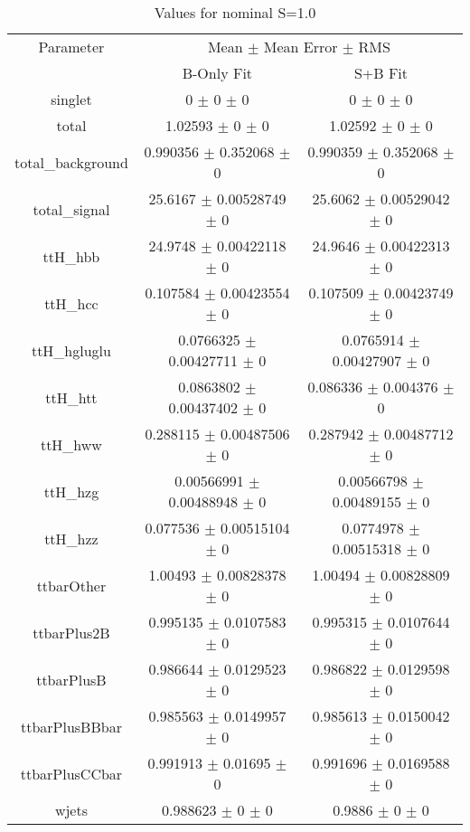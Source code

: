 \begin{table}
\centering
\caption{Values for nominal S=1.0}
\begin{tabular}{ccc}
\toprule
Parameter & \multicolumn{2}{c}{Mean $\pm$ Mean Error $\pm$ RMS}\\
 & B-Only Fit & S+B Fit\\
\midrule
singlet & \num{0} $\pm$ \num{0} $\pm$ \num{0} & \num{0} $\pm$ \num{0} $\pm$ \num{0}\\
total & \num{1.02593} $\pm$ \num{0} $\pm$ \num{0} & \num{1.02592} $\pm$ \num{0} $\pm$ \num{0}\\
total\_background & \num{0.990356} $\pm$ \num{0.352068} $\pm$ \num{0} & \num{0.990359} $\pm$ \num{0.352068} $\pm$ \num{0}\\
total\_signal & \num{25.6167} $\pm$ \num{0.00528749} $\pm$ \num{0} & \num{25.6062} $\pm$ \num{0.00529042} $\pm$ \num{0}\\
ttH\_hbb & \num{24.9748} $\pm$ \num{0.00422118} $\pm$ \num{0} & \num{24.9646} $\pm$ \num{0.00422313} $\pm$ \num{0}\\
ttH\_hcc & \num{0.107584} $\pm$ \num{0.00423554} $\pm$ \num{0} & \num{0.107509} $\pm$ \num{0.00423749} $\pm$ \num{0}\\
ttH\_hgluglu & \num{0.0766325} $\pm$ \num{0.00427711} $\pm$ \num{0} & \num{0.0765914} $\pm$ \num{0.00427907} $\pm$ \num{0}\\
ttH\_htt & \num{0.0863802} $\pm$ \num{0.00437402} $\pm$ \num{0} & \num{0.086336} $\pm$ \num{0.004376} $\pm$ \num{0}\\
ttH\_hww & \num{0.288115} $\pm$ \num{0.00487506} $\pm$ \num{0} & \num{0.287942} $\pm$ \num{0.00487712} $\pm$ \num{0}\\
ttH\_hzg & \num{0.00566991} $\pm$ \num{0.00488948} $\pm$ \num{0} & \num{0.00566798} $\pm$ \num{0.00489155} $\pm$ \num{0}\\
ttH\_hzz & \num{0.077536} $\pm$ \num{0.00515104} $\pm$ \num{0} & \num{0.0774978} $\pm$ \num{0.00515318} $\pm$ \num{0}\\
ttbarOther & \num{1.00493} $\pm$ \num{0.00828378} $\pm$ \num{0} & \num{1.00494} $\pm$ \num{0.00828809} $\pm$ \num{0}\\
ttbarPlus2B & \num{0.995135} $\pm$ \num{0.0107583} $\pm$ \num{0} & \num{0.995315} $\pm$ \num{0.0107644} $\pm$ \num{0}\\
ttbarPlusB & \num{0.986644} $\pm$ \num{0.0129523} $\pm$ \num{0} & \num{0.986822} $\pm$ \num{0.0129598} $\pm$ \num{0}\\
ttbarPlusBBbar & \num{0.985563} $\pm$ \num{0.0149957} $\pm$ \num{0} & \num{0.985613} $\pm$ \num{0.0150042} $\pm$ \num{0}\\
ttbarPlusCCbar & \num{0.991913} $\pm$ \num{0.01695} $\pm$ \num{0} & \num{0.991696} $\pm$ \num{0.0169588} $\pm$ \num{0}\\
wjets & \num{0.988623} $\pm$ \num{0} $\pm$ \num{0} & \num{0.9886} $\pm$ \num{0} $\pm$ \num{0}\\
\bottomrule
\end{tabular}
\end{table}